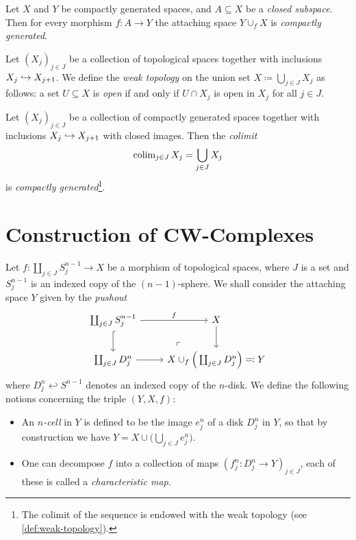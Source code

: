 \begin{proposition}
\label{prop:attaching-space-compactly-generated}
Let \(X\) and \(Y\) be compactly generated spaces, and \(A \subseteq X\) be a
\emph{closed subspace}. Then for every morphism \(f: A \to Y\) the attaching
space \(Y \cup_f X\) is \emph{compactly generated}.
\end{proposition}

\begin{definition}
\label{def:weak-topology}
Let \((X_j)_{j \in J}\) be a collection of topological spaces together with
inclusions \(X_j \hookrightarrow X_{j+1}\). We define the \emph{weak topology} on the union
set \(X \coloneq \bigcup_{j \in J} X_j\) as follows: a set \(U \subseteq X\) is
\emph{open} if and only if \(U \cap X_j\) is open in \(X_j\) for all
\(j \in J\).
\end{definition}

\begin{proposition}[Colimits]
\label{prop:compactly-generated-passage-colimit}
Let \((X_j)_{j \in J}\) be a collection of compactly generated spaces together
with inclusions \(X_j \hookrightarrow X_{j+1}\) with closed images. Then the \emph{colimit}
\[
\operatorname{colim}_{j \in J} X_j = \bigcup_{j \in J} X_j
\]
is \emph{compactly generated}\footnote{
  The colimit of the sequence is endowed with the weak topology (see
  \cref{def:weak-topology}).
}.
\end{proposition}

\section{Construction of CW-Complexes}

\begin{definition}
\label{def:attaching-cells}
Let \(f: \coprod_{j \in J} S_j^{n-1} \to X\) be a morphism of topological
spaces, where \(J\) is a set and \(S_j^{n-1}\) is an indexed copy of the
\((n-1)\)-sphere. We shall consider the attaching space \(Y\) given by the
\emph{pushout}
\[
\begin{tikzcd}
\coprod_{j \in J} S_j^{n-1} \ar[r, "f"] \ar[d, hook]
\ar[rd, phantom, "\ulcorner", very near end]
&X \ar[d]
\\
\coprod_{j \in J} D_j^n \ar[r]
&X \cup_f \Big( \coprod_{j \in J} D_j^n \Big) \eqqcolon Y
\end{tikzcd}
\]
where \(D_j^n \hookleftarrow S^{n-1}\) denotes an indexed copy of the
\(n\)-disk. We define the following notions concerning the triple \((Y, X, f)\):
\begin{itemize}\setlength\itemsep{0em}
\item An \emph{\(n\)-cell} in \(Y\) is defined to be the image \(e_j^n\) of a
  disk \(D_j^n\) in \(Y\), so that by construction we have
  \(Y = X \cup \big( \bigcup_{j \in J} e_j^n \big)\).

\item One can decompose \(f\) into a collection of maps
  \((f_j^n: D_j^n \to Y)_{j \in J}\), each of these is called a
  \emph{characteristic map}.
\end{itemize}
\end{definition}

